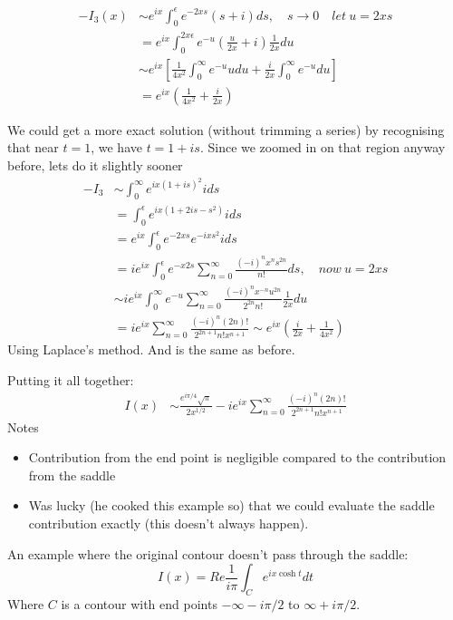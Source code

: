 \documentclass{X:/Documents/Coding/Latex/myassignment}
\begin{document}
\begin{align*}
    -I_3(x)& \sim e^{ix} \int_0^\epsilon e^{-2xs}(s+i) ds, \quad s\to 0 \quad let \ u =2xs\\
    &= e^{ix}\int_0^{2x\epsilon} e^{-u} \left(\frac{u}{2x} + i\right) \frac{1}{2x}du\\
    &\sim e^{ix} \left[\frac{1}{4x^2} \int_0^\infty e^{-u}u du + \frac{i}{2x} \int_0^\infty e^{-u}du\right]\\
    &= e^{ix} \left(\frac{1}{4x^2} + \frac{i}{2x}\right)
\end{align*}

We could get a more exact solution  (without trimming a series) by recognising that near $t=1$, we have $t = 1+is$. Since we zoomed in on that region anyway before, lets do it slightly sooner
\begin{align*}
    -I_3 &\sim \int_0^\infty e^{ix(1+is)^2}i ds\\
    &=\int_0^\epsilon e^{ix(1+2is - s^2)} ids\\
    &= e^{ix} \int_0^\epsilon e^{-2xs} e^{-ixs^2}ids\\
    &= ie^{ix} \int_0^\epsilon e^{-x2s} \sum_{n=0}^\infty \frac{(-i)^n x^n s^{2n}}{n!} ds, \quad now \ u = 2xs\\
    &\sim ie^{ix} \int_0^\infty e^{-u} \sum_{n=0}^\infty \frac{(-i)^n x^{-n} u^{2n}}{2^{2n}n!} \frac{1}{2x}du\\
    &= ie^{ix} \sum_{n=0}^\infty \frac{(-i)^n (2n)!}{2^{2n+1}n! x^{n+1}}\sim e^{ix}\left(\frac{i}{2x}+ \frac{1}{4x^2} \right)
\end{align*}
Using Laplace's method. And is the same as before.

Putting it all together:
\begin{align*}
    I(x) &\sim \frac{e^{i\pi/4}\sqrt{\pi}}{2x^{1/2}} - ie^{ix} \sum_{n=0}^\infty \frac{(-i)^n(2n)!}{2^{2n+1}n! x^{n+1}}
\end{align*}
Notes
\begin{itemize}
    \item Contribution from the end point is negligible compared to the contribution from the saddle
    \item Was lucky (he cooked this example so) that we could evaluate the saddle contribution exactly (this doesn't always happen).
\end{itemize}



An example where the original contour doesn't pass through the saddle:
\[I(x) = Re\frac{1}{i\pi} \int_C e^{ix\cosh t} dt\]
Where $C$ is a contour with end points $-\infty -i\pi/2$ to $\infty + i\pi/2$.
\end{document}
